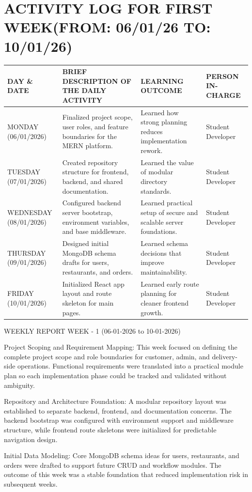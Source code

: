 \documentclass[12pt,a4paper]{report}
\begin{document}
\section*{ACTIVITY LOG FOR FIRST WEEK(FROM: 06/01/26 TO: 10/01/26)}
\begin{longtable}{|p{2.2cm}|p{5.2cm}|p{4.3cm}|p{3.2cm}|}
\hline
\textbf{DAY \& DATE} & \textbf{BRIEF DESCRIPTION OF THE DAILY ACTIVITY} & \textbf{LEARNING OUTCOME} & \textbf{PERSON IN- CHARGE} \\
\hline
MONDAY (06/01/2026) & Finalized project scope, user roles, and feature boundaries for the MERN platform. & Learned how strong planning reduces implementation rework. & Student Developer \\
\hline
TUESDAY (07/01/2026) & Created repository structure for frontend, backend, and shared documentation. & Learned the value of modular directory standards. & Student Developer \\
\hline
WEDNESDAY (08/01/2026) & Configured backend server bootstrap, environment variables, and base middleware. & Learned practical setup of secure and scalable server foundations. & Student Developer \\
\hline
THURSDAY (09/01/2026) & Designed initial MongoDB schema drafts for users, restaurants, and orders. & Learned schema decisions that improve maintainability. & Student Developer \\
\hline
FRIDAY (10/01/2026) & Initialized React app layout and route skeleton for main pages. & Learned early route planning for cleaner frontend growth. & Student Developer \\
\hline
\end{longtable}

WEEKLY REPORT
WEEK - 1 (06-01-2026 to 10-01-2026)

Project Scoping and Requirement Mapping:
This week focused on defining the complete project scope and role boundaries for customer, admin, and delivery-side operations. Functional requirements were translated into a practical module plan so each implementation phase could be tracked and validated without ambiguity.

Repository and Architecture Foundation:
A modular repository layout was established to separate backend, frontend, and documentation concerns. The backend bootstrap was configured with environment support and middleware structure, while frontend route skeletons were initialized for predictable navigation design.

Initial Data Modeling:
Core MongoDB schema ideas for users, restaurants, and orders were drafted to support future CRUD and workflow modules. The outcome of this week was a stable foundation that reduced implementation risk in subsequent weeks.
\end{document}
